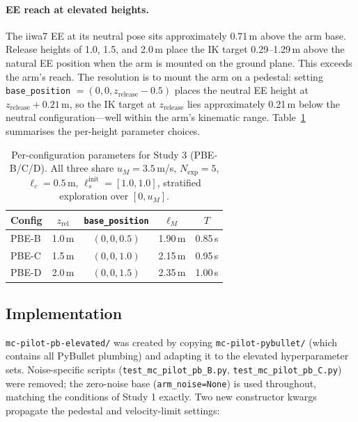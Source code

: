 \paragraph{EE reach at elevated heights.}
The iiwa7 EE at its neutral pose sits approximately 0.71\,m above the arm base.
Release heights of 1.0, 1.5, and 2.0\,m place the IK target 0.29--1.29\,m above
the natural EE position when the arm is mounted on the ground plane.
This exceeds the arm's reach.
The resolution is to mount the arm on a pedestal: setting \texttt{base\_position}
$= (0, 0, z_{\mathrm{release}} - 0.5)$ places the neutral EE height at
$z_{\mathrm{release}} + 0.21$\,m, so the IK target at $z_{\mathrm{release}}$ lies
approximately 0.21\,m below the neutral configuration---well within the arm's
kinematic range.
Table~\ref{tab:pbe_configs} summarises the per-height parameter choices.

\begin{table}[h]
  \centering
  \caption{Per-configuration parameters for Study 3 (PBE-B/C/D).
           All three share $u_M = 3.5$\,m/s, $N_{\mathrm{exp}} = 5$,
           $\ell_c = 0.5$\,m, $\ell_s^{\mathrm{init}} = [1.0, 1.0]$,
           stratified exploration over $[0, u_M]$.}
  \label{tab:pbe_configs}
  \begin{tabular}{lcccc}
    \toprule
    Config & $z_{\mathrm{rel}}$ & \texttt{base\_position} & $\ell_M$ & $T$ \\
    \midrule
    PBE-B & 1.0\,m & $(0, 0, 0.5)$  & 1.90\,m & 0.85\,s \\
    PBE-C & 1.5\,m & $(0, 0, 1.0)$  & 2.15\,m & 0.95\,s \\
    PBE-D & 2.0\,m & $(0, 0, 1.5)$  & 2.35\,m & 1.00\,s \\
    \bottomrule
  \end{tabular}
\end{table}

\subsection{Implementation}
\label{sec:study3:impl}

\texttt{mc-pilot-pb-elevated/} was created by copying \texttt{mc-pilot-pybullet/}
(which contains all PyBullet plumbing) and adapting it to the elevated hyperparameter
sets.
Noise-specific scripts (\texttt{test\_mc\_pilot\_pb\_B.py},
\texttt{test\_mc\_pilot\_pb\_C.py}) were removed; the zero-noise base
(\texttt{arm\_noise=None}) is used throughout, matching the conditions of Study 1
exactly.
Two new constructor kwargs propagate the pedestal and velocity-limit settings:

